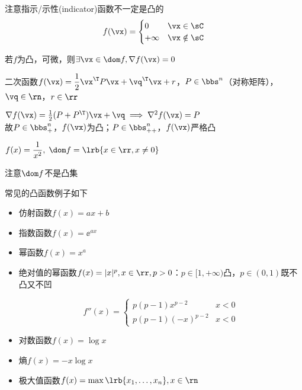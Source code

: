 注意指示/示性(indicator)函数不一定是凸的
\[f(\vx)=\begin{cases}0&\vx\in \sC\\ +\infty & \vx\notin \sC\end{cases}\]

\begin{theorem}
若$f$为凸，可微，则$\exists \vx\in\dom f,\nabla f(\vx)=0$
\end{theorem}

\begin{example}
二次函数$f(\vx)=\dfrac{1}{2}\vx^\T P\vx+\vq^\T \vx+r$，$P\in \bbs^n$（对称矩阵），$\vq\in\rn$，$r\in\rr$
\end{example}
\begin{analysis}
$\nabla f(\vx)=\frac{1}{2}(P+P^\T)\vx+\vq\implies\nabla^2 f(\vx)=P$\\
故$P\in \bbs^n_+$，$f(\vx)$为凸；$P\in \bbs_{++}^n$，$f(\vx)$严格凸
\end{analysis}

\begin{example}
$f(x)=\dfrac{1}{x^2},\;\dom f=\lrb{x\in\rr,x\ne 0}$
\end{example}
\begin{analysis}
注意$\dom f$不是凸集
\end{analysis}

常见的凸函数例子如下
\begin{itemize}
	\item 仿射函数$f(x)=ax+b$
	\item 指数函数$f(x)=\ee^{ax}$
	\item 幂函数$f(x)=x^a$
	\item 绝对值的幂函数$f(x)=|x|^p,x\in\rr,p>0$：$p\in[1,+\infty)$凸，$p\in(0,1)$既不凸又不凹
	\begin{analysis}
	\[f''(x)=\begin{cases}
	p(p-1)x^{p-2} & x<0\\
	p(p-1)(-x)^{p-2} & x<0
	\end{cases}\]
	\end{analysis}
	\item 对数函数$f(x)=\log x$
	\item 熵$f(x)=-x\log x$
	\item 极大值函数$f(x)=\max\lrb{x_1,\ldots,x_n},x\in\rn$
\end{itemize}

